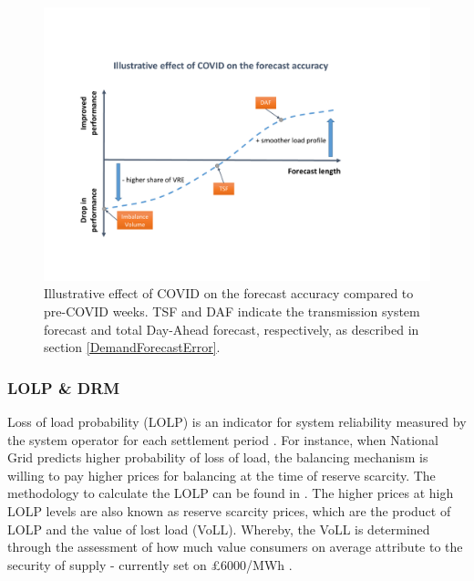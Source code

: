 \documentclass[energies,article,submit,moreauthors,pdftex]{Definitions/mdpi}
\begin{document}
\begin{figure}[H]
\centering
\hspace{-25pt}\includegraphics[trim={-1cm 3cm 3cm 3cm},clip,width=1\textwidth]{Graphics/Illustrative-forecast-summary.pdf}
\caption{Illustrative effect of COVID on the forecast accuracy compared to pre-COVID weeks. TSF and DAF indicate the transmission system forecast and total Day-Ahead forecast, respectively, as described in section \ref{DemandForecastError}.}\label{fig:Illustrative-forecast-summary}
\end{figure} 

\subsubsection{LOLP \& DRM}\label{section:LOLP_DRM}

Loss of load probability (LOLP) is an indicator for system reliability measured by the system operator for each settlement period \cite{ELEXON2019GuidanceBritain}. For instance, when National Grid predicts higher probability of loss of load, the balancing mechanism is willing to pay higher prices for balancing at the time of reserve scarcity. The methodology to calculate the LOLP can be found in \cite{Elexon2019LossStatement}. The higher prices at high LOLP levels are also known as reserve scarcity prices, which are the product of LOLP and the value of lost load (VoLL). Whereby, the VoLL is determined through the assessment of how much value consumers on average attribute to the security of supply - currently set on £6000/MWh \cite{ELEXON2019GuidanceBritain}. 
\end{document}
